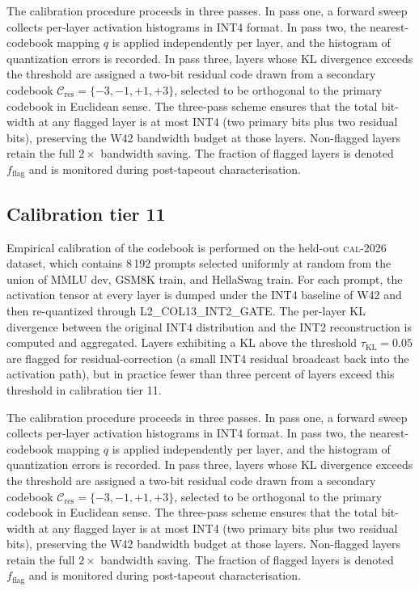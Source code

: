 The calibration procedure proceeds in three passes. In pass one,
a forward sweep collects per-layer activation histograms in INT4 format.
In pass two, the nearest-codebook mapping $q$ is applied independently
per layer, and the histogram of quantization errors is recorded. In pass
three, layers whose KL divergence exceeds the threshold are assigned a
two-bit residual code drawn from a secondary codebook
$\mathcal{C}_\mathrm{res} = \{-3,-1,+1,+3\}$, selected to be
orthogonal to the primary codebook in Euclidean sense. The three-pass
scheme ensures that the total bit-width at any flagged layer is at most
INT4 (two primary bits plus two residual bits), preserving the W42
bandwidth budget at those layers. Non-flagged layers retain the full
$2\times$ bandwidth saving. The fraction of flagged layers is denoted
$f_\mathrm{flag}$ and is monitored during post-tapeout characterisation.


\subsection{Calibration tier 11}

Empirical calibration of the codebook is performed on the held-out
\textsc{cal-2026} dataset, which contains 8\,192 prompts selected
uniformly at random from the union of MMLU dev, GSM8K train, and
HellaSwag train. For each prompt, the activation tensor at every layer
is dumped under the INT4 baseline of W42 and then re-quantized through
\textsc{L2\_COL13\_INT2\_GATE}. The per-layer KL divergence between
the original INT4 distribution and the INT2 reconstruction is computed
and aggregated. Layers exhibiting a KL above the threshold
$\tau_{\mathrm{KL}} = 0.05$ are flagged for residual-correction (a
small INT4 residual broadcast back into the activation path), but in
practice fewer than three percent of layers exceed this threshold in
calibration tier 11.

The calibration procedure proceeds in three passes. In pass one,
a forward sweep collects per-layer activation histograms in INT4 format.
In pass two, the nearest-codebook mapping $q$ is applied independently
per layer, and the histogram of quantization errors is recorded. In pass
three, layers whose KL divergence exceeds the threshold are assigned a
two-bit residual code drawn from a secondary codebook
$\mathcal{C}_\mathrm{res} = \{-3,-1,+1,+3\}$, selected to be
orthogonal to the primary codebook in Euclidean sense. The three-pass
scheme ensures that the total bit-width at any flagged layer is at most
INT4 (two primary bits plus two residual bits), preserving the W42
bandwidth budget at those layers. Non-flagged layers retain the full
$2\times$ bandwidth saving. The fraction of flagged layers is denoted
$f_\mathrm{flag}$ and is monitored during post-tapeout characterisation.


